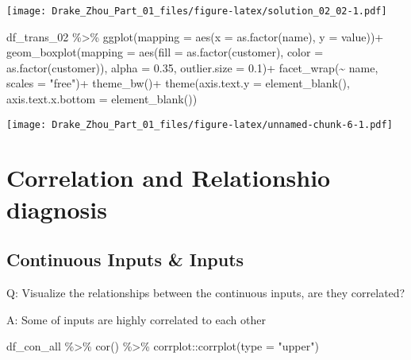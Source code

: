 \documentclass[
]{article}
\newenvironment{Shaded}{\begin{snugshade}}{\end{snugshade}}
\newcommand{\AttributeTok}[1]{\textcolor[rgb]{0.77,0.63,0.00}{#1}}
\newcommand{\FloatTok}[1]{\textcolor[rgb]{0.00,0.00,0.81}{#1}}
\newcommand{\FunctionTok}[1]{\textcolor[rgb]{0.00,0.00,0.00}{#1}}
\newcommand{\NormalTok}[1]{#1}
\newcommand{\SpecialCharTok}[1]{\textcolor[rgb]{0.00,0.00,0.00}{#1}}
\newcommand{\StringTok}[1]{\textcolor[rgb]{0.31,0.60,0.02}{#1}}
\begin{document}
\texttt{[image: Drake\_Zhou\_Part\_01\_files/figure-latex/solution\_02\_02-1.pdf]}

\begin{Shaded}
\begin{Highlighting}[]
\NormalTok{df\_trans\_02 }\SpecialCharTok{\%\textgreater{}\%}
  \FunctionTok{ggplot}\NormalTok{(}\AttributeTok{mapping =} \FunctionTok{aes}\NormalTok{(}\AttributeTok{x =} \FunctionTok{as.factor}\NormalTok{(name), }\AttributeTok{y =}\NormalTok{ value))}\SpecialCharTok{+}
  \FunctionTok{geom\_boxplot}\NormalTok{(}\AttributeTok{mapping =} \FunctionTok{aes}\NormalTok{(}\AttributeTok{fill =} \FunctionTok{as.factor}\NormalTok{(customer), }\AttributeTok{color =} \FunctionTok{as.factor}\NormalTok{(customer)),}
               \AttributeTok{alpha =} \FloatTok{0.35}\NormalTok{, }\AttributeTok{outlier.size =} \FloatTok{0.1}\NormalTok{)}\SpecialCharTok{+}
  \FunctionTok{facet\_wrap}\NormalTok{(}\SpecialCharTok{\textasciitilde{}}\NormalTok{ name, }\AttributeTok{scales =} \StringTok{"free"}\NormalTok{)}\SpecialCharTok{+}
  \FunctionTok{theme\_bw}\NormalTok{()}\SpecialCharTok{+}
  \FunctionTok{theme}\NormalTok{(}\AttributeTok{axis.text.y =} \FunctionTok{element\_blank}\NormalTok{(), }\AttributeTok{axis.text.x.bottom =} \FunctionTok{element\_blank}\NormalTok{())}
\end{Highlighting}
\end{Shaded}

\texttt{[image: Drake\_Zhou\_Part\_01\_files/figure-latex/unnamed-chunk-6-1.pdf]}

\hypertarget{correlation-and-relationshio-diagnosis}{%
\section{Correlation and Relationshio
diagnosis}\label{correlation-and-relationshio-diagnosis}}

\hypertarget{continuous-inputs-inputs}{%
\subsection{Continuous Inputs \&
Inputs}\label{continuous-inputs-inputs}}

Q: Visualize the relationships between the continuous inputs, are they
correlated?

A: Some of inputs are highly correlated to each other

\begin{Shaded}
\begin{Highlighting}[]
\NormalTok{df\_con\_all }\SpecialCharTok{\%\textgreater{}\%}
  \FunctionTok{cor}\NormalTok{() }\SpecialCharTok{\%\textgreater{}\%}
\NormalTok{  corrplot}\SpecialCharTok{::}\FunctionTok{corrplot}\NormalTok{(}\AttributeTok{type =} \StringTok{"upper"}\NormalTok{)}
\end{Highlighting}
\end{Shaded}
\end{document}
